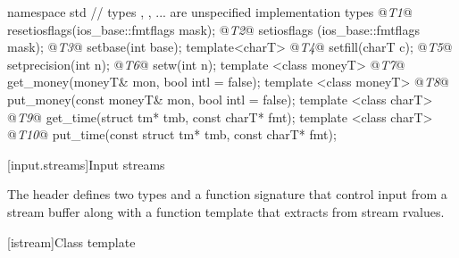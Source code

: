%
%
%
%

%

\begin{codeblock}
namespace std {
  // types , , ... are unspecified implementation types
  @\textit{T1}@ resetiosflags(ios_base::fmtflags mask);
  @\textit{T2}@ setiosflags  (ios_base::fmtflags mask);
  @\textit{T3}@ setbase(int base);
  template<charT> @\textit{T4}@ setfill(charT c);
  @\textit{T5}@ setprecision(int n);
  @\textit{T6}@ setw(int n);
  template <class moneyT> @\textit{T7}@ get_money(moneyT& mon, bool intl = false);
  template <class moneyT> @\textit{T8}@ put_money(const moneyT& mon, bool intl = false);
  template <class charT> @\textit{T9}@ get_time(struct tm* tmb, const charT* fmt);
  template <class charT> @\textit{T10}@ put_time(const struct tm* tmb, const charT* fmt);
}
\end{codeblock}

[input.streams]{Input streams}

\pnum
The header
defines two types
and a function signature that control input from a stream buffer along with a function template that extracts from stream rvalues.

[istream]{Class template }

